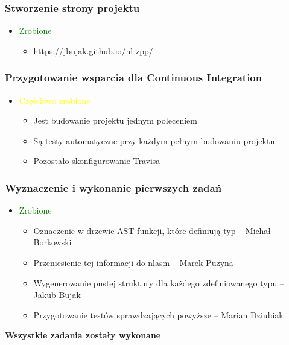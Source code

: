 \documentclass{beamer}
\begin{document}
	\begin{frame}
		\frametitle{Stworzenie strony projektu}
		\begin{itemize}
			\item\textcolor{green}{Zrobione}
			\begin{itemize}
				\item https://jbujak.github.io/nl-zpp/ 
			\end{itemize}
		\end{itemize}
	\end{frame}
	
	\begin{frame}
		\frametitle{Przygotowanie wsparcia dla Continuous Integration}
		\begin{itemize}
			\item\textcolor{yellow}{Częściowo zrobione}
			\begin{itemize}
				\item Jest budowanie projektu jednym poleceniem
				\item Są testy automatyczne przy każdym pełnym budowaniu projektu
				\item Pozostało skonfigurowanie Travisa
			\end{itemize}
		\end{itemize}
	\end{frame}
	
	\begin{frame}
		\frametitle{Wyznaczenie i wykonanie pierwszych zadań}
		\begin{itemize}
			\item \textcolor{green}{Zrobione}
			\begin{itemize}
				\item Oznaczenie w drzewie AST funkcji, które definiują typ -- Michał Borkowski
				\item Przeniesienie tej informacji do nlasm -- Marek Puzyna
				\item Wygenerowanie pustej struktury dla każdego zdefiniowanego typu -- Jakub Bujak
				\item Przygotowanie testów sprawdzających powyższe -- Marian Dziubiak
			\end{itemize}
		\end{itemize}
		\pause
		\textbf{Wszystkie zadania zostały wykonane}
	\end{frame}
	
\end{document}
